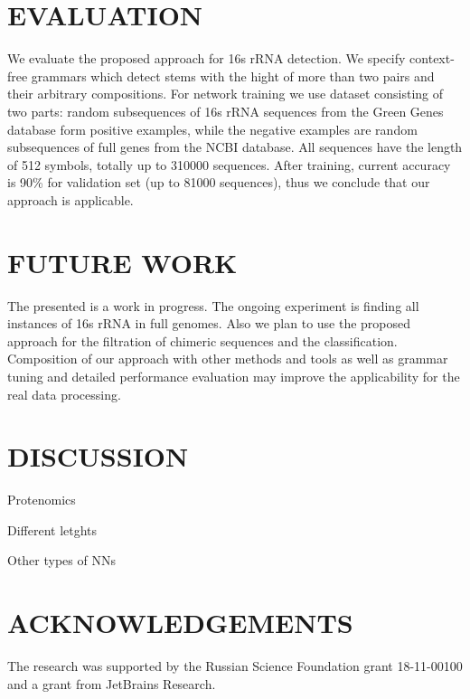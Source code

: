\documentclass[a4paper,twoside]{article}
\begin{document}
\section{\uppercase{Evaluation}}
\label{sec:evaluation}

\noindent We evaluate the proposed approach for 16s rRNA detection.
We specify context-free grammars which detect stems with the hight of more than two pairs and their arbitrary compositions.
For network training we use dataset consisting of two parts: random subsequences of 16s rRNA sequences from the Green Genes database form positive examples, while the negative examples are random subsequences of full genes from the NCBI database.
All sequences have the length of 512 symbols, totally up to 310000 sequences.
After training, current accuracy is 90\% for validation set (up to 81000 sequences), thus we conclude that our approach is applicable.

\section{\uppercase{Future Work}}
\label{sec:FutureWork}

\noindent The presented is a work in progress. 
The ongoing experiment is finding all instances of 16s rRNA in full genomes.
Also we plan to use the proposed approach for the filtration of chimeric sequences and the classification.
Composition of our approach with other methods and tools as well as grammar tuning and detailed performance evaluation may improve the applicability for the real data processing.


\section{\uppercase{Discussion}}
\label{sec:Discussion}

Protenomics

Different letghts

Other types of NNs




\section*{\uppercase{Acknowledgements}}

\noindent The research was supported by the Russian Science Foundation grant 18-11-00100 and a grant from JetBrains Research.


\vfill

{\small
}


\vfill
\end{document}
